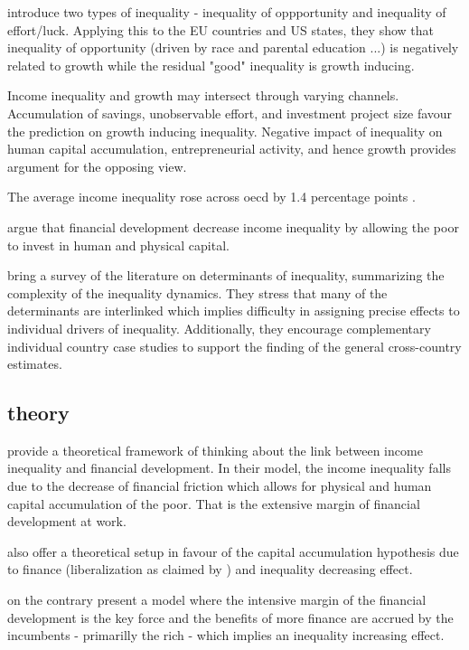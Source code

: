 \documentclass[a4paper,11pt]{article}
\begin{document}
\citet{marrero2013inequality} introduce two types of inequality - inequality of oppportunity and inequality of effort/luck. Applying this to the EU countries and US states, they show that inequality of opportunity (driven by race and parental education ...) is negatively related to growth while the residual "good" inequality is growth inducing.

Income inequality and growth may intersect through varying channels. Accumulation of savings, unobservable effort, and investment project size favour the prediction on growth inducing inequality. Negative impact of inequality on human capital accumulation, entrepreneurial activity, and hence growth provides argument for the opposing view.

The average income inequality rose across \ac{oecd} by 1.4 percentage points \citep{oecd2013crisis}.

\citet{LawSingh2014} argue that financial development decrease income inequality by allowing the poor to invest in human and physical capital.

\citet{nolan2019drivers} bring a survey of the literature on determinants of inequality, summarizing the complexity of the inequality dynamics. They stress that many of the determinants are interlinked which implies difficulty in assigning precise effects to individual drivers of inequality. Additionally, they encourage complementary individual country case studies to support the finding of the general cross-country estimates.

\subsection{theory}
\citet{galormoav2004} provide a theoretical framework of thinking about the link between income inequality and financial development. In their model, the income inequality falls due to the decrease of financial friction which allows for physical and human capital accumulation of the poor. That is the extensive margin of financial development at work.

\citet{banerjeenewman1990} also offer a theoretical setup in favour of the capital accumulation hypothesis due to finance (liberalization as claimed by \citet{de2017finance}) and inequality decreasing effect.

\citet{GreenwoodJovanovic1990} on the contrary present a model where the intensive margin of the financial development is the key force and the benefits of more finance are accrued by the incumbents - primarilly the rich - which implies an inequality increasing effect.
\end{document}
